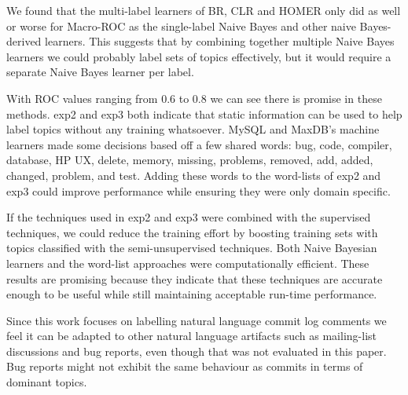 \documentclass[smallextended]{svjour3}       %
\begin{document}
We found that the multi-label learners of BR, CLR and HOMER only did
as well or worse for Macro-ROC as the single-label Naive Bayes and other naive Bayes-derived learners. 
This suggests that by combining together multiple Naive Bayes learners
we could probably label sets of topics effectively, but it would
require a separate Naive Bayes learner per label.


With ROC values ranging from $0.6$ to $0.8$ we can see there is promise in these methods.
\textsf{exp2} and \textsf{exp3} both indicate that static information can be used to help label topics without any training whatsoever. 
MySQL and MaxDB's machine learners made some decisions based off a few shared words: \textsf{bug, code, compiler, database, HP UX, delete, memory,
missing, problems, removed, add, added, changed, problem, and test}. 
Adding these words to the word-lists of \textsf{exp2} and \textsf{exp3} could improve performance while ensuring they were only domain specific.

If the techniques used in \textsf{exp2} and \textsf{exp3} were combined with the supervised techniques, we could reduce the training effort by boosting
training sets with topics classified with the semi-unsupervised techniques.
Both Naive Bayesian learners and the word-list approaches were computationally efficient.  
These results are promising because they indicate that these
techniques are accurate enough to be useful while still maintaining
acceptable run-time performance.

Since this work focuses on labelling natural language commit log
comments we feel it can be adapted to other natural language artifacts
such as mailing-list discussions and bug reports, even though that was
not evaluated in this paper. Bug reports might not exhibit the same
behaviour as commits in terms of dominant topics.
\end{document}
